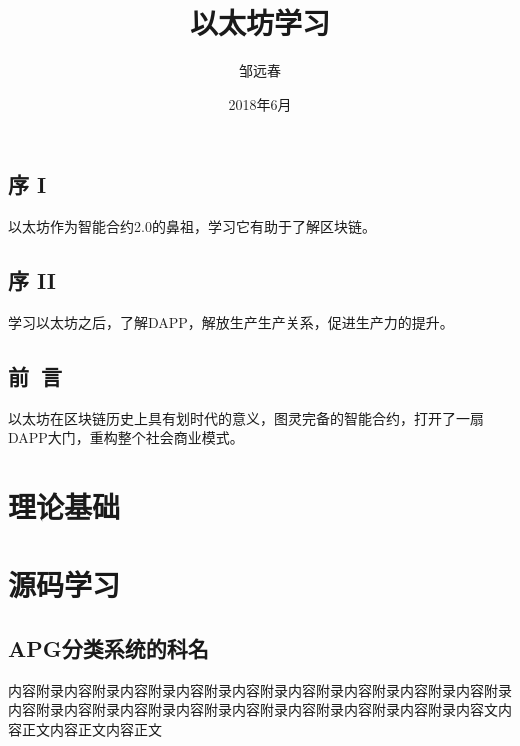 \documentclass[utf8]{book}
\begin{document}
\title{\heiti 以太坊学习}
\author{\fangsong 邹远春}
\date{2018年6月}

\frontmatter
\maketitle

\chapter{序 I}

以太坊作为智能合约2.0的鼻祖，学习它有助于了解区块链。

\chapter{序 II}

学习以太坊之后，了解DAPP，解放生产生产关系，促进生产力的提升。

\chapter{前~言}

以太坊在区块链历史上具有划时代的意义，图灵完备的智能合约，打开了一扇DAPP大门，重构整个社会商业模式。

\renewcommand\contentsname{目~录}
\tableofcontents

\mainmatter

\part{理论基础}




\part{源码学习}





\appendix

\chapter{APG分类系统的科名}

内容附录内容附录内容附录内容附录内容附录内容附录内容附录内容附录内容附录内容附录内容附录内容附录内容附录内容附录内容附录内容附录内容附录内容文内容正文内容正文内容正文
\end{document}
